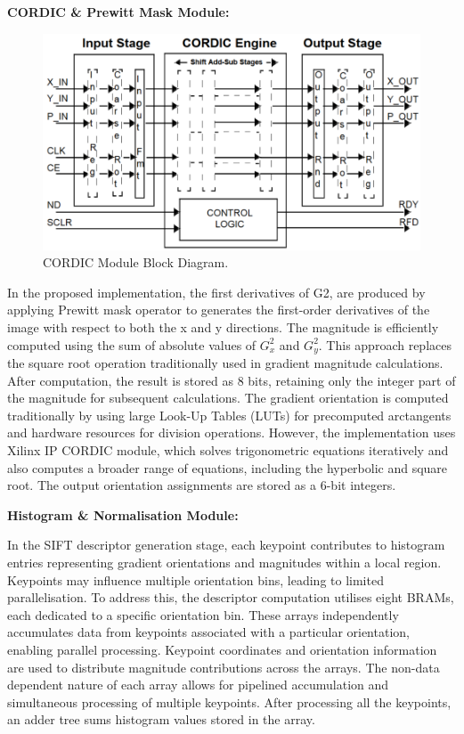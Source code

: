\textbf{CORDIC \& Prewitt Mask Module:}
\begin{figure}[h]
    \centering
     \includegraphics[width=0.8\columnwidth]{Images/CORDIC.png}
    \caption{CORDIC Module Block Diagram. \cite{AMD12}}
    \label{fig:CORDIC}
\end{figure}

In the proposed implementation, the first derivatives of G2, are produced by applying Prewitt mask operator to generates the first-order derivatives of the image with respect to both the x and y directions. The magnitude is efficiently computed using the sum of absolute values of \( G_x^2 \) and \( G_y^2 \). This approach replaces the square root operation traditionally used in gradient magnitude calculations. After computation, the result is stored as 8 bits, retaining only the integer part of the magnitude for subsequent calculations. The gradient orientation is computed traditionally by using large Look-Up Tables (LUTs) for precomputed arctangents and hardware resources for division operations. However, the implementation uses Xilinx IP CORDIC module, which solves trigonometric equations iteratively and also computes a broader range of equations, including the hyperbolic and square root. The output orientation assignments are stored as a 6-bit integers.


\textbf{Histogram \& Normalisation Module:}

In the SIFT descriptor generation stage, each keypoint contributes to histogram entries representing gradient orientations and magnitudes within a local region. Keypoints may influence multiple orientation bins, leading to limited parallelisation. To address this, the descriptor computation utilises eight BRAMs, each dedicated to a specific orientation bin. These arrays independently accumulates data from keypoints associated with a particular orientation, enabling parallel processing. Keypoint coordinates and orientation information are used to distribute magnitude contributions across the arrays. The non-data dependent nature of each array allows for pipelined accumulation and simultaneous processing of multiple keypoints. After processing all the keypoints, an adder tree sums histogram values stored in the array. 




